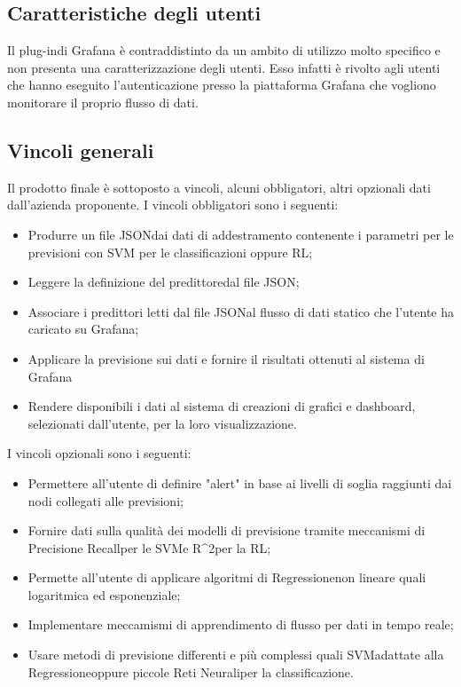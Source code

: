 	\subsection{Caratteristiche degli utenti}
	Il plug-in\glosp di Grafana è contraddistinto da un ambito di utilizzo molto specifico e non presenta una caratterizzazione degli utenti. Esso infatti è rivolto agli utenti che hanno eseguito l'autenticazione presso la piattaforma Grafana che vogliono monitorare il proprio flusso di dati.
	\subsection{Vincoli generali}
	Il prodotto finale è sottoposto a vincoli, alcuni obbligatori, altri opzionali dati dall'azienda proponente.
	I vincoli obbligatori sono i seguenti:
	\begin{itemize}
		\item Produrre un file JSON\glosp dai dati di addestramento contenente i parametri per le previsioni con SVM per le classificazioni oppure RL;
		\item Leggere la definizione del predittore\glosp dal file JSON\glo;
		\item Associare i predittori letti dal file JSON\glosp al flusso di dati statico che l'utente ha caricato su Grafana;
		\item Applicare la previsione sui dati e fornire il risultati ottenuti al sistema di Grafana
		\item Rendere disponibili i dati al sistema di creazioni di grafici e dashboard, selezionati dall'utente, per la loro visualizzazione.
	\end{itemize}
	I vincoli opzionali sono i seguenti:
	\begin{itemize}
		\item Permettere all'utente di definire "alert" in base ai livelli di soglia raggiunti dai nodi collegati alle previsioni;
		\item Fornire dati sulla qualità dei modelli di previsione tramite meccanismi di Precision\glosp e Recall\glosp per le SVM\glosp e R^2\glosp per la RL\glo;
		\item Permette all'utente di applicare algoritmi di Regressione\glosp non lineare quali logaritmica ed esponenziale;
		\item Implementare meccamismi di apprendimento di flusso per dati in tempo reale;
		\item Usare metodi di previsione differenti e più complessi quali SVM\glosp adattate alla Regressione\glosp oppure piccole Reti Neurali\glosp per la classificazione\glo.
	\end{itemize}
